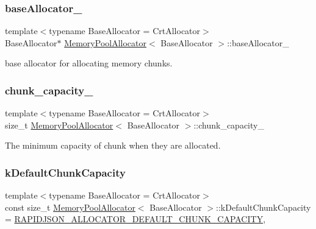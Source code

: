 \subsubsection{\texorpdfstring{base\+Allocator\+\_\+}{baseAllocator\_}}
{\footnotesize\ttfamily template$<$typename Base\+Allocator = Crt\+Allocator$>$ \\
Base\+Allocator$\ast$ \hyperlink{classMemoryPoolAllocator}{Memory\+Pool\+Allocator}$<$ Base\+Allocator $>$\+::base\+Allocator\+\_\+\hspace{0.3cm}{\ttfamily [private]}}



base allocator for allocating memory chunks. 

\mbox{\label{classMemoryPoolAllocator_a67909468c193d429a227a74d35c4d8cb}} 
\subsubsection{\texorpdfstring{chunk\+\_\+capacity\+\_\+}{chunk\_capacity\_}}
{\footnotesize\ttfamily template$<$typename Base\+Allocator = Crt\+Allocator$>$ \\
size\+\_\+t \hyperlink{classMemoryPoolAllocator}{Memory\+Pool\+Allocator}$<$ Base\+Allocator $>$\+::chunk\+\_\+capacity\+\_\+\hspace{0.3cm}{\ttfamily [private]}}



The minimum capacity of chunk when they are allocated. 

\mbox{\label{classMemoryPoolAllocator_a8d9337bc406a25dd06a24ee3fa5fb58c}} 
\subsubsection{\texorpdfstring{k\+Default\+Chunk\+Capacity}{kDefaultChunkCapacity}}
{\footnotesize\ttfamily template$<$typename Base\+Allocator = Crt\+Allocator$>$ \\
const size\+\_\+t \hyperlink{classMemoryPoolAllocator}{Memory\+Pool\+Allocator}$<$ Base\+Allocator $>$\+::k\+Default\+Chunk\+Capacity = \hyperlink{group__RAPIDJSON__CONFIG_ga860570d04d489be08b9835d2ec58bac5}{R\+A\+P\+I\+D\+J\+S\+O\+N\+\_\+\+A\+L\+L\+O\+C\+A\+T\+O\+R\+\_\+\+D\+E\+F\+A\+U\+L\+T\+\_\+\+C\+H\+U\+N\+K\+\_\+\+C\+A\+P\+A\+C\+I\+TY}\hspace{0.3cm}{\ttfamily [static]}, {\ttfamily [private]}}



